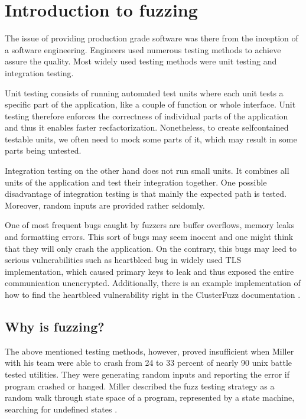 \chapter{Introduction to fuzzing}
\label{cha:Introduction to fuzzing}
The issue of providing production grade software was there from the inception of a software engineering. Engineers used numerous testing methods to achieve assure the quality. Most widely used testing methods were unit testing and integration testing.

Unit testing consists of running automated test units where each unit tests a specific part of the application, like a couple of function or whole interface. Unit testing therefore enforces the correctness of individual parts of the application and thus it enables faster recfactorization. Nonetheless, to create selfcontained testable units, we often need to mock some parts of it, which may result in some parts being untested.

Integration testing on the other hand does not run small units. It combines all units of the application and test their integration together. One possible disadvantage of integration testing is that mainly the expected path is tested. Moreover, random inputs are provided rather seldomly.

One of most frequent bugs caught by fuzzers are buffer overflows, memory leaks and formatting errors. This sort of bugs may seem inocent and one might think that they will only crash the application. On the contrary, this bugs may leed to serious vulnerabilities such as heartbleed bug \cite{heartbleed2020bug} in widely used TLS implementation, which caused primary keys to leak and thus exposed the entire communication unencrypted. Additionally, there is an example implementation of how to find the heartbleed vulnerability right in the ClusterFuzz documentation \cite{clusterfuzz2020heartbleed}.

\section{Why is fuzzing?}
The above mentioned testing methods, however, proved insufficient when Miller with his team were able to crash from 24 to 33 percent of nearly 90 unix battle tested utilities. They were generating random inputs and reporting the error if program crashed or hanged. Miller described the fuzz testing strategy as a random walk through state space of a program, represented by a state machine, searching for undefined states \cite{miller1990empirical}.

